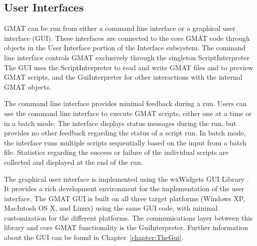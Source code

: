 

\subsection{User Interfaces}

GMAT can be run from either a command line interface or a graphical user interface (GUI).  These
interfaces are connected to the core GMAT code through objects in the User Interface
portion of the Interface subsystem. The command line interface controls GMAT exclusively through
the singleton ScriptInterpreter  The GUI uses the ScriptInterpreter to read and write GMAT files
and to preview GMAT scripts, and the GuiInterpreter for other interactions with the internal GMAT
objects.

The command line interface provides minimal feedback during a run.  Users can use the command line
interface to execute GMAT scripts, either one at a time or in a batch mode.  The interface displays
status messages during the run, but provides no other feedback regarding the status of a script
run.  In batch mode, the interface runs multiple scripts sequentially based on the input from a
batch file.  Statistics regarding the success or failure of the individual scripts are collected
and displayed at the end of the run.

The graphical user interface is implemented using the wxWidgets GUI Library \cite{wxWidgets}.
It provides a rich development environment for the implementation of the user interface.  The GMAT
GUI is built on all three target platforms (Windows XP, MacIntosh OS X, and Linux) using the same
GUI code, with minimal customization for the different platforms.  The communications layer between
this library and core GMAT functionality is the GuiInterpreter.  Further information about the GUI
can be found in Chapter~\ref{chapter:TheGui}.

